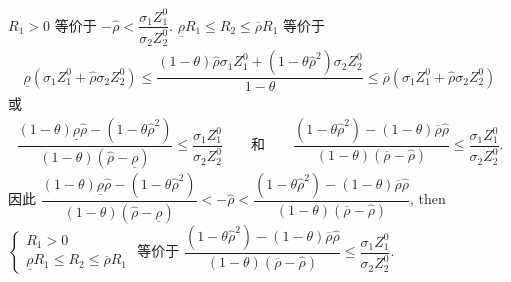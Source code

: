 \documentclass[10.0pt]{article}
\begin{document}
$ R_1 > 0 $ 等价于 $ - {\hat \rho} < \dfrac{\sigma_1 Z_1^0}{\sigma_2 Z_2^0} $.
$ \underline{\rho} R_1 \leqslant R_2 \leqslant \overline{\rho} R_1 $ 等价于 
\begin{eqnarray*}
\underline{\rho} (\sigma_1 Z_1^0 + {\hat \rho} \sigma_2 Z_2^0) \leqslant \dfrac{(1 - \theta) {\hat \rho} \sigma_1 Z_1^0 + (1 - \theta {\hat \rho}^2) \sigma_2 Z_2^0}{1 - \theta} \leqslant \overline{\rho} (\sigma_1 Z_1^0 + {\hat \rho} \sigma_2 Z_2^0)
\end{eqnarray*} 
或
\begin{eqnarray*}
\dfrac{(1 - \theta) \underline{\rho} {\hat \rho} - (1 - \theta {\hat \rho}^2)}{(1 - \theta) ({\hat \rho} - \underline{\rho})} \leqslant \dfrac{\sigma_1 Z_1^0}{\sigma_2 Z_2^0} \qquad \text{和} \qquad \dfrac{(1 - \theta {\hat \rho}^2) - (1 - \theta) \overline{\rho} {\hat \rho}}{(1 - \theta) (\overline{\rho} - {\hat \rho})} \leqslant \dfrac{\sigma_1 Z_1^0}{\sigma_2 Z_2^0}.
\end{eqnarray*}
因此 $ \dfrac{(1 - \theta) \underline{\rho} {\hat \rho} - (1 - \theta {\hat \rho}^2)}{(1 - \theta) ({\hat \rho} - \underline{\rho})} < - {\hat \rho} < \dfrac{(1 - \theta {\hat \rho}^2) - (1 - \theta) \overline{\rho} {\hat \rho}}{(1 - \theta) (\overline{\rho} - {\hat \rho})} $, then $ \left\{ \begin{matrix} R_1 > 0 \\ \underline{\rho} R_1 \leqslant R_2 \leqslant \overline{\rho} R_1 \end{matrix} \right. $ 等价于 $ \dfrac{(1 - \theta {\hat \rho}^2) - (1 - \theta) \overline{\rho} {\hat \rho}}{(1 - \theta) (\overline{\rho} - {\hat \rho})} \leqslant \dfrac{\sigma_1 Z_1^0}{\sigma_2 Z_2^0} $.
\end{document}
